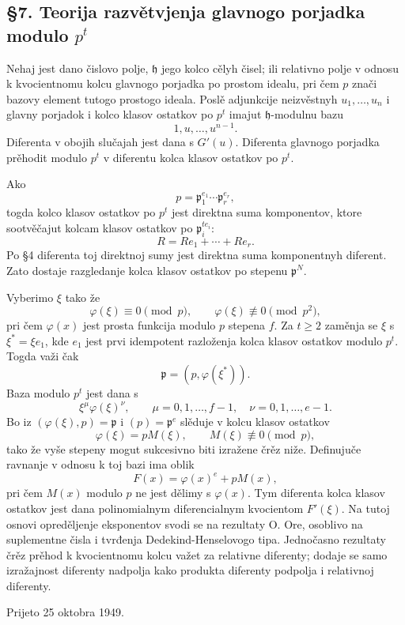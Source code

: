 \documentclass[11pt]{article}
\begin{document}
\subsection*{§7. Teorija razvětvjenja glavnogo porjadka modulo \(p^t\)}

Nehaj jest dano čislovo polje, \(\mathfrak h\) jego kolco cělyh čisel; ili relativno polje v odnosu k kvocientnomu kolcu glavnogo porjadka po prostom idealu, pri čem \(p\) znači bazovy element tutogo prostogo ideala. Poslě adjunkcije neizvěstnyh \(u_1,\ldots,u_n\) i glavny porjadok i kolco klasov ostatkov po \(p^t\) imajut \(\mathfrak h\)-modulnu bazu
\[
        1,u,\ldots,u^{n-1}.
\]
Diferenta v obojih slučajah jest dana s \(G'(u)\). Diferenta glavnogo porjadka prěhodit modulo \(p^t\) v diferentu kolca klasov ostatkov po \(p^t\).

Ako
\[
        p=\mathfrak p_1^{e_1}
        \cdots\mathfrak p_r^{e_r},
\]
togda kolco klasov ostatkov po \(p^t\) jest direktna suma komponentov, ktore sootvěčajut kolcam klasov ostatkov po \(\mathfrak p_i^{te_i}\):
\[
        R=Re_1+
        \cdots+Re_r.
\]
Po §4 diferenta toj direktnoj sumy jest direktna suma komponentnyh diferent. Zato dostaje razgledanje kolca klasov ostatkov po stepenu \(\mathfrak p^N\).

Vyberimo \(\xi\) tako že
\[
        \varphi(\xi)\equiv0\pmod p,
        \qquad
        \varphi(\xi)\not\equiv0\pmod {p^2},
\]
pri čem \(\varphi(x)\) jest prosta funkcija modulo \(p\) stepena \(f\). Za \(t\ge2\) zaměnja se \(\xi\) s \(\xi^*=\xi e_1\), kde \(e_1\) jest prvi idempotent razloženja kolca klasov ostatkov modulo \(p^t\). Togda važi čak
\[
        \mathfrak p=(p,\varphi(\xi^*)).
\]
Baza modulo \(p^t\) jest dana s
\[
        \xi^{\mu}\varphi(\xi)^{\nu},
        \qquad
        \mu=0,1,\ldots,f-1,
        \quad
        \nu=0,1,\ldots,e-1.
\]
Bo iz \((\varphi(\xi),p)=\mathfrak p\) i \((p)=\mathfrak p^e\) slěduje v kolcu klasov ostatkov
\[
        \varphi(\xi)=pM(\xi),
        \qquad M(\xi)\not\equiv0\pmod p,
\]
tako že vyše stepeny mogut sukcesivno biti izražene črěz niže. Definujuče ravnanje v odnosu k toj bazi ima oblik
\[
        F(x)=\varphi(x)^e+pM(x),
\]
pri čem \(M(x)\) modulo \(p\) ne jest dělimy s \(\varphi(x)\). Tym diferenta kolca klasov ostatkov jest dana polinomialnym diferencialnym kvocientom \(F'(\xi)\). Na tutoj osnovi opreděljenje eksponentov svodi se na rezultaty O. Ore, osoblivo na suplementne čisla i tvrđenja Dedekind-Henselovogo tipa. Jednočasno rezultaty črěz prěhod k kvocientnomu kolcu važet za relativne diferenty; dodaje se samo izražajnost diferenty nadpolja kako produkta diferenty podpolja i relativnoj diferenty.

\begin{center}
Prijeto 25 oktobra 1949.
\end{center}
\end{document}
